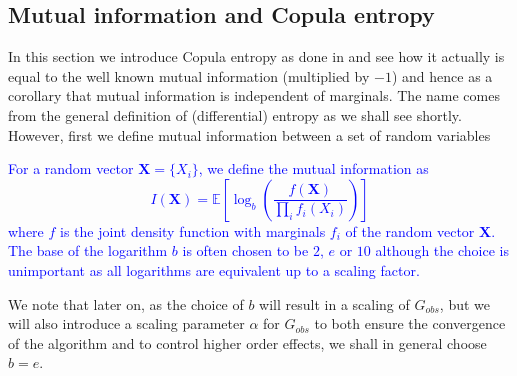 \documentclass[../Thesis.tex]{subfiles}
\begin{document}
\subsection{Mutual information and Copula entropy}
In this section we introduce Copula entropy as done in \cite{Nonparametric-copula-entropy-and-network-deconvolution-method-for-causal-discovery-in-complex-manufacturing-systems} and see how it actually is equal to the well known mutual information (multiplied by $-1$) and hence as a corollary that mutual information is independent of marginals. The name comes from the general definition of (differential) entropy as we shall see shortly. However, first we define mutual information between a set of random variables
\textcolor{blue}{
    \begin{definition}\label{def:mutual information}
        For a random vector $\boldsymbol{X} = \{X_i\}$, we define the mutual information as
        $$I(\boldsymbol{X}) = \mathbb{E}\left[\log_b \left(\frac{f(\boldsymbol X)}{\prod_i f_i (X_i)}\right)\right]$$
        where $f$ is the joint density function with marginals $f_i$ of the random vector $\boldsymbol{X}$.
        The base of the logarithm $b$ is often chosen to be $2$, $e$ or $10$ although the choice is unimportant as all logarithms are equivalent up to a scaling factor.
    \end{definition}
}
We note that later on, as the choice of $b$ will result in a scaling of $G_{obs}$, but we will also introduce a scaling parameter $\alpha$ for $G_{obs}$ to both ensure the convergence of the algorithm and to control higher order effects, we shall in general choose $b = e$.
\end{document}

